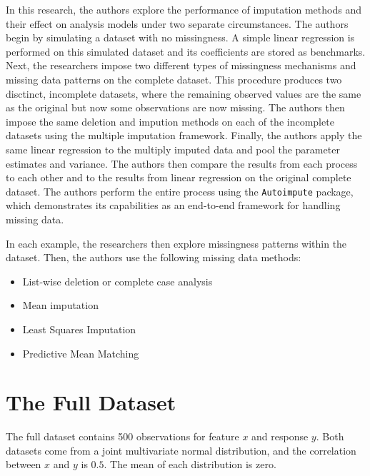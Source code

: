 \documentclass[12pt,oneside]{chicagocapstone}
\providecommand{\tightlist}{%
  \setlength{\itemsep}{0pt}\setlength{\parskip}{0pt}}
\begin{document}
In this research, the authors explore the performance of imputation
methods and their effect on analysis models under two separate
circumstances. The authors begin by simulating a dataset with no
missingness. A simple linear regression is performed on this simulated
dataset and its coefficients are stored as benchmarks. Next, the
researchers impose two different types of missingness mechanisms and
missing data patterns on the complete dataset. This procedure produces
two disctinct, incomplete datasets, where the remaining observed values
are the same as the original but now some observations are now missing.
The authors then impose the same deletion and impution methods on each
of the incomplete datasets using the multiple imputation framework.
Finally, the authors apply the same linear regression to the multiply
imputed data and pool the parameter estimates and variance. The authors
then compare the results from each process to each other and to the
results from linear regression on the original complete dataset. The
authors perform the entire process using the \texttt{Autoimpute}
package, which demonstrates its capabilities as an end-to-end framework
for handling missing data.

In each example, the researchers then explore missingness patterns
within the dataset. Then, the authors use the following missing data
methods:
\begin{itemize}
\tightlist
\item
  List-wise deletion or complete case analysis
\item
  Mean imputation
\item
  Least Squares Imputation
\item
  Predictive Mean Matching
\end{itemize}
\section*{The Full Dataset}\label{the-full-dataset}

The full dataset contains 500 observations for feature \(x\) and
response \(y\). Both datasets come from a joint multivariate normal
distribution, and the correlation between \(x\) and \(y\) is \(0.5\).
The mean of each distribution is zero.
\end{document}
